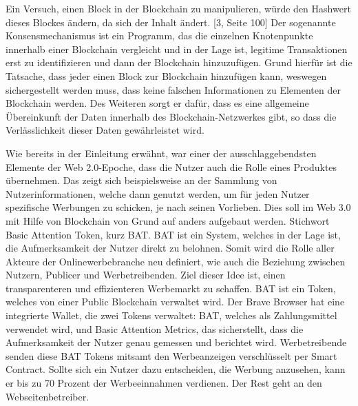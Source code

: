 

Ein Versuch, einen Block in der Blockchain zu manipulieren, würde den Hashwert dieses Blockes ändern, da sich der Inhalt ändert. [3, Seite 100]
Der sogenannte Konsensmechanismus ist ein Programm, das die einzelnen Knotenpunkte innerhalb einer Blockchain vergleicht und in der Lage ist, legitime Transaktionen erst zu identifizieren und dann der Blockchain hinzuzufügen.
Grund hierfür ist die Tatsache, dass jeder einen Block zur Blockchain hinzufügen kann, weswegen sichergestellt werden muss, dass keine falschen Informationen zu Elementen der Blockchain werden.
Des Weiteren sorgt er dafür, dass es eine allgemeine Übereinkunft der Daten innerhalb des Blockchain-Netzwerkes gibt, so dass die Verlässlichkeit dieser Daten gewährleistet wird.

Wie bereits in der Einleitung erwähnt, war einer der ausschlaggebendsten Elemente der Web 2.0-Epoche, dass die Nutzer auch die Rolle eines Produktes übernehmen.
Das zeigt sich beispielsweise an der Sammlung von Nutzerinformationen, welche dann genutzt werden, um für jeden Nutzer spezifische Werbungen zu schicken, je nach seinen Vorlieben.
Dies soll im Web 3.0 mit Hilfe von Blockchain von Grund auf anders aufgebaut werden. Stichwort Basic Attention Token, kurz BAT.
BAT ist ein System, welches in der Lage ist, die Aufmerksamkeit der Nutzer direkt zu belohnen.
Somit wird die Rolle aller Akteure der Onlinewerbebranche neu definiert, wie auch die Beziehung zwischen Nutzern, Publicer und Werbetreibenden.
Ziel dieser Idee ist, einen transparenteren und effizienteren Werbemarkt zu schaffen. BAT ist ein Token, welches von einer Public Blockchain verwaltet wird.
Der Brave Browser hat eine integrierte Wallet, die zwei Tokens verwaltet: BAT, welches als Zahlungsmittel verwendet wird, und Basic Attention Metrics, das sicherstellt, dass die Aufmerksamkeit der Nutzer genau gemessen und berichtet wird.
Werbetreibende senden diese BAT Tokens mitsamt den Werbeanzeigen verschlüsselt per Smart Contract. Sollte sich ein Nutzer dazu entscheiden, die Werbung anzusehen, kann er bis zu 70 Prozent der Werbeeinnahmen verdienen.
Der Rest geht an den Webseitenbetreiber.

